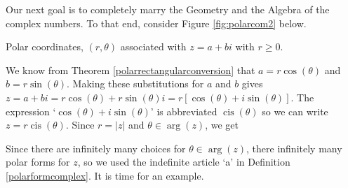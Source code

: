 \smallskip


Our next goal is to completely marry the Geometry and the Algebra of the complex numbers.  To that end,  consider Figure \ref{fig:polarcom2} below.

\medskip

\noindent\begin{minipage}{\textwidth}
\begin{center}
\end{center}
\captionsetup{type=figure}
\caption{Polar coordinates, $(r, \theta)$ associated with $z = a+bi$ with $r \geq 0$.}\label{fig:polarcom2}
\end{minipage}

\medskip

We know from  Theorem \ref{polarrectangularconversion} that $a = r\cos(\theta)$ and $b = r\sin(\theta)$. Making these substitutions for $a$ and $b$ gives $z = a + bi = r\cos(\theta) + r \sin(\theta) i = r \left[\cos(\theta) + i \sin(\theta)\right]$. The expression `$\cos(\theta) + i\sin(\theta)$' is abbreviated $\operatorname{cis}(\theta)$ so we can write  $z = r\operatorname{cis}(\theta)$.	Since  $r = |z|$ and $\theta \in \operatorname{arg}(z)$, we get

\medskip


\medskip										

Since there are infinitely many choices for $\theta \in \operatorname{arg}(z)$, there infinitely many polar forms for $z$, so we used the indefinite article `a' in Definition \ref{polarformcomplex}.  It is time for an example.

\medskip

